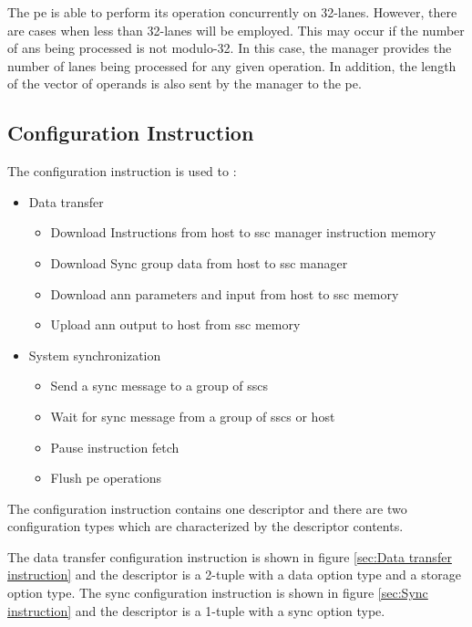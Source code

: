 The \ac{pe} is able to perform its operation concurrently on 32-lanes. However, there are cases when less than 32-lanes will be employed. This may occur if the number of \acp{an} being processed is not modulo-32. In this case, the manager provides the number of lanes being processed for any given operation. In addition, the length of the vector of operands is also sent by the manager to the \ac{pe}.
\fi

\subsection{Configuration Instruction}
\label{sec:Configuration Instruction}

The configuration instruction is used to :
\begin{itemize}
  \lbbcleanspace
    \item Data transfer
    \begin{itemize}
      \item Download Instructions from host to \ac{ssc} manager instruction memory
      \item Download Sync group data from host to \ac{ssc} manager 
      \item Download \ac{ann} parameters and input from host to \ac{ssc} memory
      \item Upload \ac{ann} output to host from \ac{ssc} memory
    \end{itemize}
  \item System synchronization
    \begin{itemize}
      \item Send a sync message to a group of \acp{ssc}
      \item Wait for sync message from a group of \acp{ssc} or host
      \item Pause instruction fetch
      \item Flush \ac{pe} operations
    \end{itemize}
\end{itemize}

The configuration instruction contains one descriptor and there are two configuration types which are characterized by the descriptor contents.

The data transfer configuration instruction is shown in figure \ref{sec:Data transfer instruction} and the descriptor is a 2-tuple with a data option type and a storage option type.
The sync configuration instruction is shown in figure \ref{sec:Sync instruction} and the descriptor is a 1-tuple with a sync option type.


